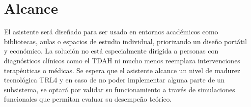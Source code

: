     
                
           
            
            
           
            
    \section{Alcance}
    \label{sec:Alcance}
     El asistente será diseñado para ser usado en entornos académicos como bibliotecas, aulas o espacios de estudio individual, priorizando un diseño portátil y económico. La solución no está especialmente dirigida a personas con diagnósticos clínicos como el \ac{TDAH} ni mucho menos reemplaza intervenciones terapéuticas o médicas. Se espera que el asistente alcance un nivel de madurez tecnológica TRL4 \autocite{ibanez2014niveles} y en caso de no poder implementar alguna parte de un subsistema, se optará por validar su funcionamiento a través de simulaciones funcionales que permitan evaluar su desempeño teórico.
    
